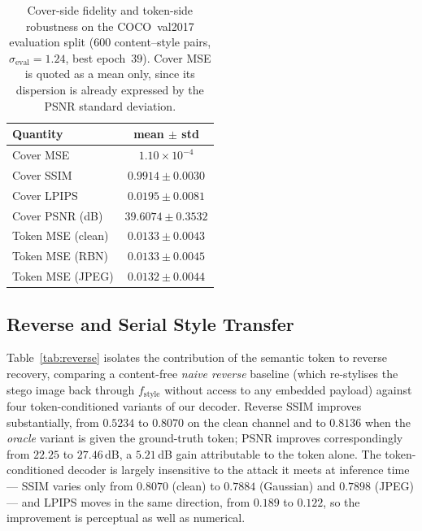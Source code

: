 \documentclass[conference]{IEEEtran}
\begin{document}
\begin{table}[htbp]
\centering
\scriptsize
\caption{Cover-side fidelity and token-side robustness on the COCO~val2017 evaluation split ($600$ content--style pairs, $\sigma_{\text{eval}}=1.24$, best epoch~$39$). Cover MSE is quoted as a mean only, since its dispersion is already expressed by the PSNR standard deviation.}
\label{tab:cover}
\setlength{\tabcolsep}{8pt}
\begin{tabular}{l c}
\toprule
\textbf{Quantity} & \textbf{mean $\pm$ std} \\
\midrule
Cover MSE         & $1.10\!\times\!10^{-4}$ \\
Cover SSIM        & $0.9914 \pm 0.0030$ \\
Cover LPIPS       & $0.0195 \pm 0.0081$ \\
Cover PSNR (dB)   & $39.6074 \pm 0.3532$ \\
\midrule
Token MSE (clean) & $0.0133 \pm 0.0043$ \\
Token MSE (RBN)   & $0.0133 \pm 0.0045$ \\
Token MSE (JPEG)  & $0.0132 \pm 0.0044$ \\
\bottomrule
\end{tabular}
\end{table}

\subsection{Reverse and Serial Style Transfer}
\label{sec:exp_reverse}
Table~\ref{tab:reverse} isolates the contribution of the semantic token to reverse recovery, comparing a content-free \emph{naive reverse} baseline (which re-stylises the stego image back through $f_{\text{style}}$ without access to any embedded payload) against four token-conditioned variants of our decoder. Reverse SSIM improves substantially, from $0.5234$ to $0.8070$ on the clean channel and to $0.8136$ when the \emph{oracle} variant is given the ground-truth token; PSNR improves correspondingly from $22.25$ to $27.46$\,dB, a $5.21$\,dB gain attributable to the token alone. The token-conditioned decoder is largely insensitive to the attack it meets at inference time --- SSIM varies only from $0.8070$ (clean) to $0.7884$ (Gaussian) and $0.7898$ (JPEG) --- and LPIPS moves in the same direction, from $0.189$ to $0.122$, so the improvement is perceptual as well as numerical.
\end{document}

